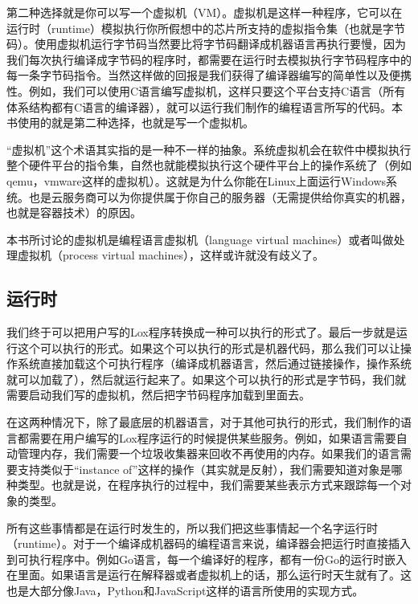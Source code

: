 \documentclass[cn,10pt,math=newtx,citestyle=gb7714-2015,bibstyle=gb7714-2015]{elegantbook}
\begin{document}
第二种选择就是你可以写一个虚拟机（VM）。虚拟机是这样一种程序，它可以在运行时（runtime）模拟执行你所假想中的芯片所支持的虚拟指令集（也就是字节码）。使用虚拟机运行字节码当然要比将字节码翻译成机器语言再执行要慢，因为我们每次执行编译成字节码的程序时，都需要在运行时去模拟执行字节码程序中的每一条字节码指令。当然这样做的回报是我们获得了编译器编写的简单性以及便携性。例如，我们可以使用C语言编写虚拟机，这样只要这个平台支持C语言（所有体系结构都有C语言的编译器），就可以运行我们制作的编程语言所写的代码。本书使用的就是第二种选择，也就是写一个虚拟机。

\begin{tcolorbox}
“虚拟机”这个术语其实指的是一种不一样的抽象。系统虚拟机会在软件中模拟执行整个硬件平台的指令集，自然也就能模拟执行这个硬件平台上的操作系统了（例如qemu，vmware这样的虚拟机）。这就是为什么你能在Linux上面运行Windows系统。也是云服务商可以为你提供属于你自己的服务器（无需提供给你真实的机器，也就是容器技术）的原因。

本书所讨论的虚拟机是编程语言虚拟机（language virtual machines）或者叫做处理虚拟机（process virtual machines），这样或许就没有歧义了。
\end{tcolorbox}

\subsection{运行时}

我们终于可以把用户写的Lox程序转换成一种可以执行的形式了。最后一步就是运行这个可以执行的形式。如果这个可以执行的形式是机器代码，那么我们可以让操作系统直接加载这个可执行程序（编译成机器语言，然后通过链接操作，操作系统就可以加载了），然后就运行起来了。如果这个可以执行的形式是字节码，我们就需要启动我们写的虚拟机，然后把字节码程序加载到里面去。

在这两种情况下，除了最底层的机器语言，对于其他可执行的形式，我们制作的语言都需要在用户编写的Lox程序运行的时候提供某些服务。例如，如果语言需要自动管理内存，我们需要一个垃圾收集器来回收不再使用的内存。如果我们的语言需要支持类似于“instance of”这样的操作（其实就是反射），我们需要知道对象是哪种类型。也就是说，在程序执行的过程中，我们需要某些表示方式来跟踪每一个对象的类型。

所有这些事情都是在运行时发生的，所以我们把这些事情起一个名字运行时（runtime）。对于一个编译成机器码的编程语言来说，编译器会把运行时直接插入到可执行程序中。例如Go语言，每一个编译好的程序，都有一份Go的运行时嵌入在里面。如果语言是运行在解释器或者虚拟机上的话，那么运行时天生就有了。这也是大部分像Java，Python和JavaScript这样的语言所使用的实现方式。
\end{document}

